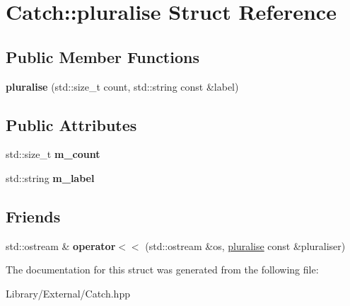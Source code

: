\hypertarget{struct_catch_1_1pluralise}{}\section{Catch\+:\+:pluralise Struct Reference}
\label{struct_catch_1_1pluralise}
\subsection*{Public Member Functions}
\begin{DoxyCompactItemize}
\item 
\hypertarget{struct_catch_1_1pluralise_a5c55e22de2416cfe416edf715c6b9234}{}{\bfseries pluralise} (std\+::size\+\_\+t count, std\+::string const \&label)\label{struct_catch_1_1pluralise_a5c55e22de2416cfe416edf715c6b9234}

\end{DoxyCompactItemize}
\subsection*{Public Attributes}
\begin{DoxyCompactItemize}
\item 
\hypertarget{struct_catch_1_1pluralise_a4dce2fa13ec6f00fac09b2418265441e}{}std\+::size\+\_\+t {\bfseries m\+\_\+count}\label{struct_catch_1_1pluralise_a4dce2fa13ec6f00fac09b2418265441e}

\item 
\hypertarget{struct_catch_1_1pluralise_a8849cbdd3f11ebe7747597c8644e8793}{}std\+::string {\bfseries m\+\_\+label}\label{struct_catch_1_1pluralise_a8849cbdd3f11ebe7747597c8644e8793}

\end{DoxyCompactItemize}
\subsection*{Friends}
\begin{DoxyCompactItemize}
\item 
\hypertarget{struct_catch_1_1pluralise_aa7dac6b165514c1f85e0695d678fdef5}{}std\+::ostream \& {\bfseries operator$<$$<$} (std\+::ostream \&os, \hyperlink{struct_catch_1_1pluralise}{pluralise} const \&pluraliser)\label{struct_catch_1_1pluralise_aa7dac6b165514c1f85e0695d678fdef5}

\end{DoxyCompactItemize}


The documentation for this struct was generated from the following file\+:\begin{DoxyCompactItemize}
\item 
Library/\+External/Catch.\+hpp\end{DoxyCompactItemize}
